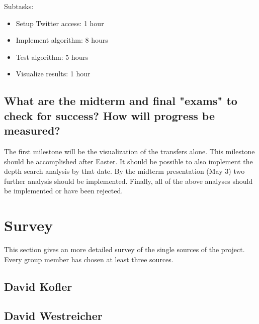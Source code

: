 \documentclass{article}
\begin{document}
Subtasks:
\begin{itemize}
\item Setup Twitter access: 1 hour
\item Implement algorithm: 8 hours
\item Test algorithm: 5 hours
\item Visualize results: 1 hour
\end{itemize}

\subsection{What are the midterm and final "exams" to check for success? How will progress be measured?}

The first milestone will be the visualization of the transfers alone. This milestone should be accomplished after Easter. It should be possible to also implement the depth search analysis by that date. By the midterm presentation (May 3) two further analysis should be implemented. Finally, all of the above analyses should be implemented or have been rejected.

\section{Survey}
This section gives an more detailed survey of the single sources of the project. Every group member has chosen at least three sources.
\subsection{David Kofler}

\subsection{David Westreicher}
\end{document}
